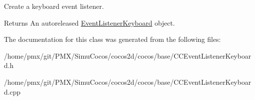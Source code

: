 Create a keyboard event listener.

\begin{DoxyReturn}{Returns}
An autoreleased \hyperlink{classEventListenerKeyboard}{Event\+Listener\+Keyboard} object. 
\end{DoxyReturn}


The documentation for this class was generated from the following files\+:\begin{DoxyCompactItemize}
\item 
/home/pmx/git/\+P\+M\+X/\+Simu\+Cocos/cocos2d/cocos/base/C\+C\+Event\+Listener\+Keyboard.\+h\item 
/home/pmx/git/\+P\+M\+X/\+Simu\+Cocos/cocos2d/cocos/base/C\+C\+Event\+Listener\+Keyboard.\+cpp\end{DoxyCompactItemize}

